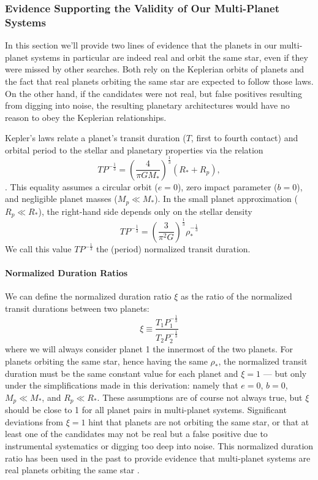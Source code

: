 \documentclass[twocolumn]{aastex62}
\begin{document}
\subsubsection{Evidence Supporting the Validity of Our Multi-Planet Systems}
\label{sec:validity}

In this section we'll provide two lines of evidence that the planets
in our multi-planet systems in particular are indeed real and orbit
the same star, even if they were missed by other searches.  Both rely
on the Keplerian orbits of planets and the fact that real planets
orbiting the same star are expected to follow those laws.  On the
other hand, if the candidates were not real, but false positives
resulting from digging into noise, the resulting planetary
architectures would have no reason to obey the Keplerian
relationships.

Kepler's laws relate a planet's transit duration ($T$, first to fourth
contact) and orbital period to the stellar and planetary properties
via the relation
\begin{equation}
T P^{-\frac{1}{3}} = \left( \frac{4}{\pi G M_*} \right)^\frac{1}{3}
\left(R_* + R_p \right),
\end{equation}
\citep{sea03}.  This equality assumes a circular orbit ($e=0$), zero
impact parameter ($b=0$), and negligible planet masses ($M_p \ll
M_*$). In the small planet approximation ($R_p \ll R_*$), the
right-hand side depends only on the stellar density
\begin{equation}T P^{-\frac{1}{3}} = \left( \frac{3}{\pi^2 G} \right)^\frac{1}{3} \rho_*^{-\frac{1}{3}} \label{eq:density} \end{equation}
We call this value $T P^{-\frac{1}{3}}$ the (period) normalized
transit duration.


\paragraph{Normalized Duration Ratios}

We can define the normalized duration ratio $\xi$ as the ratio of the
normalized transit durations between two planets:
\[ \xi \equiv \frac{T_1  P_1^{-\frac{1}{3}}}{T_2 P_2^{-\frac{1}{3}}} \]
where we will always consider planet 1 the innermost of the two
planets.  For planets orbiting the same star, hence having the same
$\rho_*$, the normalized transit duration must be the same constant
value for each planet and $\xi = 1$ --- but only under the
simplifications made in this derivation: namely that $e=0$, $b=0$,
$M_p \ll M_*$, and $R_p \ll R_*$.  These assumptions are of course not
always true, but $\xi$ should be close to 1 for all planet pairs in
multi-planet systems. Significant deviations from $\xi=1$ hint that
planets are not orbiting the same star, or that at least one of the
candidates may not be real but a false positive due to instrumental
systematics or digging too deep into noise. This normalized duration
ratio has been used in the past to provide evidence that multi-planet
systems are real planets orbiting the same star \citep{ste10, fab14}.
\end{document}
